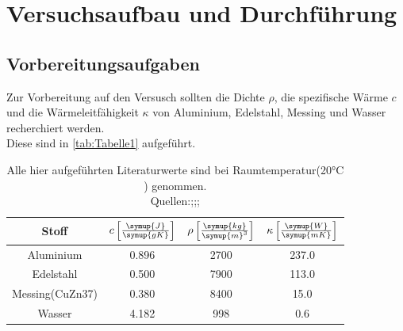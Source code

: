 
\section{Versuchsaufbau und Durchführung}
\label{sec:Durchführung}
\subsection{Vorbereitungsaufgaben}
\label{subsec:Aufgaben}
Zur Vorbereitung auf den Versusch sollten die Dichte $\rho$, die spezifische Wärme $c$ und
die Wärmeleitfähigkeit $\kappa$ von Aluminium, Edelstahl, Messing und Wasser recherchiert werden.\\
Diese sind in \autoref{tab:Tabelle1} aufgeführt.
\begin{table}[H]
    \centering
    \caption{Alle hier aufgeführten Literaturwerte sind bei Raumtemperatur(20$\unit{\celsius}$) genommen. \\Quellen:\cite{stahl};\cite{demt};\cite{Geschke}; }
    \label{tab:Tabelle1}
    \begin{tabular}{cccc}
        \toprule
        Stoff&
        {$c \left[\frac{\symup{J}}{\symup{gK}}\right]$} &
        {$\rho \left[\frac{\symup{kg}}{\symup{m}^3}\right]$} &
        {$\kappa \left[\frac{\symup{W}}{\symup{mK}}\right]$} \\
        \midrule
        Aluminium & 0.896 & 2700 & 237.0 \\
        Edelstahl & 0.500 & 7900 & 113.0 \\
        Messing(CuZn37) & 0.380 & 8400 & 15.0 \\
        Wasser & 4.182 & 998 & 0.6 \\
        \bottomrule
    \end{tabular}
\end{table}

